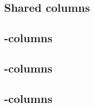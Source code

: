 \subsection{Shared columns               }   \label{oob: columns: shared}         
\subsection{\oobMacro{}-columns          }   \label{oob: columns: macro}          
\subsection{\oobComputation{}-columns    }   \label{oob: columns: scenario}       
\subsection{\oobScenario{}-columns       }   \label{oob: columns: computation}    
